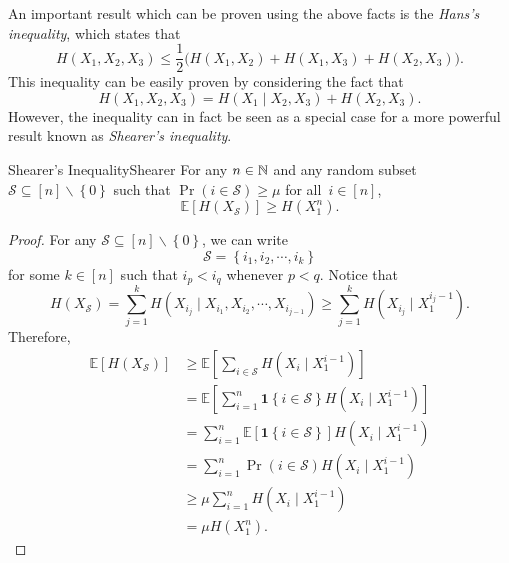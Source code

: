 \documentclass[math, code]{amznotes}
\theoremstyle{remark}
\begin{document}
An important result which can be proven using the above facts is the \textit{Hans's inequality}, which states that 
\begin{equation*}
    H\left(X_1, X_2, X_3\right) \leq \frac{1}{2}\bigl(H\left(X_1, X_2\right) + H\left(X_1, X_3\right) + H\left(X_2, X_3\right)\bigr).
\end{equation*}
This inequality can be easily proven by considering the fact that 
\begin{equation*}
    H\left(X_1, X_2, X_3\right) = H\left(X_1 \mid X_2, X_3\right) + H\left(X_2, X_3\right).
\end{equation*}
However, the inequality can in fact be seen as a special case for a more powerful result known as \textit{Shearer's inequality}.
\begin{thmbox}{Shearer's Inequality}{Shearer}
    For any $n \in \mathbb{N}$ and any random subset $\mathcal{S} \subseteq \left[n\right] \backslash \left\{0\right\}$ such that $\Pr\left(i \in \mathcal{S}\right) \geq \mu$ for all~$i \in \left[n\right]$, 
    \begin{equation*}
        \mathbb{E}\left[H\left(X_{\mathcal{S}}\right)\right] \geq H\left(X_1^n\right).
    \end{equation*} 
    \tcblower
    \begin{proof}
        For any $\mathcal{S} \subseteq \left[n\right] \backslash \left\{0\right\}$, we can write 
        \begin{equation*}
            \mathcal{S} = \left\{i_1, i_2, \cdots, i_k\right\}
        \end{equation*}
        for some $k \in \left[n\right]$ such that $i_p < i_q$ whenever $p < q$. Notice that 
        \begin{equation*}
            H\left(X_{\mathcal{S}}\right) = \sum_{j = 1}^{k}H\left(X_{i_j} \mid X_{i_1}, X_{i_2}, \cdots, X_{i_{j - 1}}\right) \geq \sum_{j = 1}^{k}H\left(X_{i_j} \mid X_1^{i_j - 1}\right).
        \end{equation*}
        Therefore,
        \begin{align*}
            \mathbb{E}\left[H\left(X_{\mathcal{S}}\right)\right] & \geq \mathbb{E}\left[\sum_{i \in \mathcal{S}}H\left(X_{i} \mid X_1^{i - 1}\right)\right] \\
            & = \mathbb{E}\left[\sum_{i = 1}^{n}\mathbf{1}\left\{i \in \mathcal{S}\right\}H\left(X_{i} \mid X_1^{i - 1}\right)\right] \\
            & = \sum_{i = 1}^{n}\mathbb{E}\left[\mathbf{1}\left\{i \in \mathcal{S}\right\}\right]H\left(X_{i} \mid X_1^{i - 1}\right) \\
            & = \sum_{i = 1}^{n}\Pr\left(i \in \mathcal{S}\right)H\left(X_{i} \mid X_1^{i - 1}\right) \\
            & \geq \mu\sum_{i = 1}^{n}H\left(X_{i} \mid X_1^{i - 1}\right) \\
            & = \mu H\left(X_1^n\right).
        \end{align*}
    \end{proof}
\end{thmbox}
\end{document}
